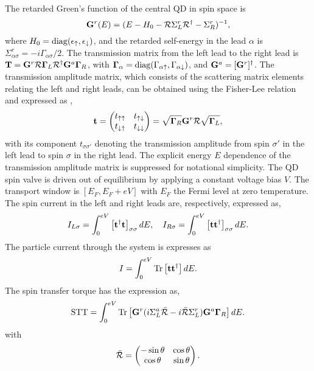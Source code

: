 \documentclass[aps,prb,twocolumn,footinbib,showpacs,superscriptaddress,preprintnumbers,amsmath,amssymb]{revtex4-1}
\begin{document}
	The retarded Green's function of the central QD in spin space is
\begin{equation}
{\bf G}^r(E) = (E-H_0-{\cal R} \Sigma_L^r {\cal R}^\dag -\Sigma_R^r)^{-1},
\end{equation}
where $H_0={\rm diag}(\epsilon_\uparrow, \epsilon_\downarrow)$, and the retarded self-energy in the lead $\alpha$ is $\Sigma_{\alpha\sigma}^r=-i\Gamma_{\alpha\sigma}/2$.
The transmission matrix from the left lead to the right lead is ${\bf T}={\bf G}^r {\cal R} {\bf \Gamma}_L {\cal R}^\dag {\bf G}^a {\bf \Gamma}_R$, with ${\bf \Gamma}_\alpha = {\rm diag}(\Gamma_{\alpha\uparrow}, \Gamma_{\alpha\downarrow})$, and ${\bf G}^a = [{\bf G}^r]^\dag$.
The transmission amplitude matrix, which consists of the scattering matrix elements relating the left and right leads, can be obtained using the Fisher-Lee relation and expressed as  \cite{Datta,JianWang,off-diagonal},
\begin{equation}
{\bf t} = \begin{pmatrix}
t_{\uparrow\uparrow} & t_{\uparrow\downarrow} \\
t_{\downarrow\uparrow} & t_{\downarrow\downarrow}
\end{pmatrix} 
= \sqrt{{\bf \Gamma}_R} {\bf G}^r {\cal R} \sqrt{{\bf \Gamma}_L},
\end{equation}
with its component $t_{\sigma\sigma'}$ denoting the transmission amplitude from spin $\sigma'$ in the left lead to spin $\sigma$ in the right lead. The explicit energy $E$ dependence of the transmission amplitude matrix is suppressed for notational simplicity. The QD spin valve is driven out of equilibrium by applying a constant voltage bias $V$. The transport window is $[E_F, E_F+eV]$ with $E_F$ the Fermi level at zero temperature. 
The spin current in the left and right leads are, respectively, expressed as,
\begin{equation}
I_{L\sigma} = \int_{0}^{eV} \left[{\bf t}^\dag {\bf t} \right]_{\sigma\sigma} dE , \quad
I_{R\sigma} = \int_{0}^{eV} \left[{\bf t} {\bf t}^\dag \right]_{\sigma\sigma} dE .
\end{equation}
The particle current through the system is expresses as
\begin{equation}
I = \int_{0}^{eV} {\rm Tr}\left[{\bf t} {\bf t}^\dag \right] dE .
\end{equation}
The spin transfer torque has the expression as, \cite{YunjinYu}
\begin{equation}
{\rm STT} = \int_{0}^{eV} {\rm Tr}\left[ {\bf G}^r (i\Sigma_L^a {\cal \bar{R}}- i{\cal \bar{R}}\Sigma_L^r ) {\bf G}^a  {\bf \Gamma}_R \right] dE .
\end{equation}
with 
\begin{equation}  \label{rotation}
{\cal \bar{R}}=\begin{pmatrix}
-\sin\theta  & \cos\theta  \\ \cos\theta & \sin\theta
\end{pmatrix} .
\end{equation}
\end{document}
